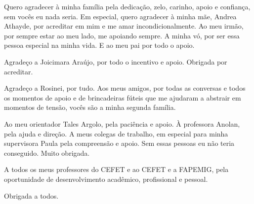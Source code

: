 %
%

\begin{agradecimentos}

Quero agradecer à minha família pela dedicação, zelo, carinho, apoio e confiança, sem vocês eu nada seria. Em especial, quero agradecer à minha mãe, Andrea Athayde, por acreditar em mim e me amar incondicionalmente. Ao meu irmão, por sempre estar ao meu lado, me apoiando sempre. A minha vó, por ser essa pessoa especial na minha vida. E ao meu pai por todo o apoio.

Agradeço a Joicimara Araújo, por todo o incentivo e apoio. Obrigada por acreditar.

Agradeço a Rosinei, por tudo. Aos meus amigos, por todas as conversas e todos os momentos de apoio e de brincadeiras fúteis que me ajudaram a abstrair em momentos de tensão, vocês são a minha segunda família. 

Ao meu orientador Tales Argolo, pela paciência e apoio. À professora Anolan, pela ajuda e direção. A meus colegas de trabalho, em especial para minha supervisora Paula pela compreensão e apoio. Sem essas pessoas eu não teria conseguido. Muito obrigada.

A todos os meus professores do CEFET e ao CEFET e a FAPEMIG, pela oportunidade de desenvolvimento acadêmico, profissional e pessoal.

Obrigada a todos.   
\end{agradecimentos}
